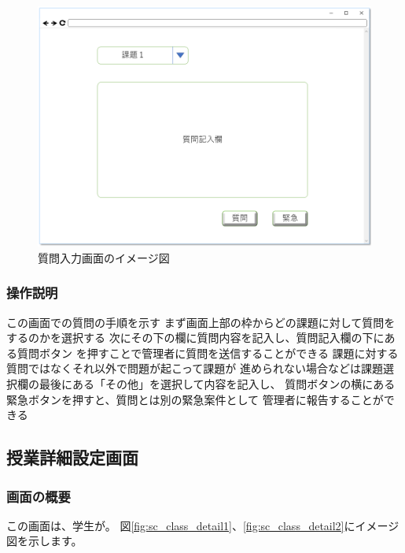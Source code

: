 \begin{figure}[htbp]
\begin{center}
  \includegraphics[width=1\linewidth,clip]{./img/sc_input_q.png}
  \caption{質問入力画面のイメージ図}\label{fig:sc_input_q}
\end{center}
\end{figure}

\subsubsection{操作説明}
この画面での質問の手順を示す
まず画面上部の枠からどの課題に対して質問をするのかを選択する
次にその下の欄に質問内容を記入し、質問記入欄の下にある質問ボタン
を押すことで管理者に質問を送信することができる
課題に対する質問ではなくそれ以外で問題が起こって課題が
進められない場合などは課題選択欄の最後にある「その他」を選択して内容を記入し、
質問ボタンの横にある緊急ボタンを押すと、質問とは別の緊急案件として
管理者に報告することができる

\subsection{授業詳細設定画面}
\subsubsection{画面の概要}
この画面は、学生が。
図\ref{fig:sc_class_detail1}、\ref{fig:sc_class_detail2}にイメージ図を示します。

